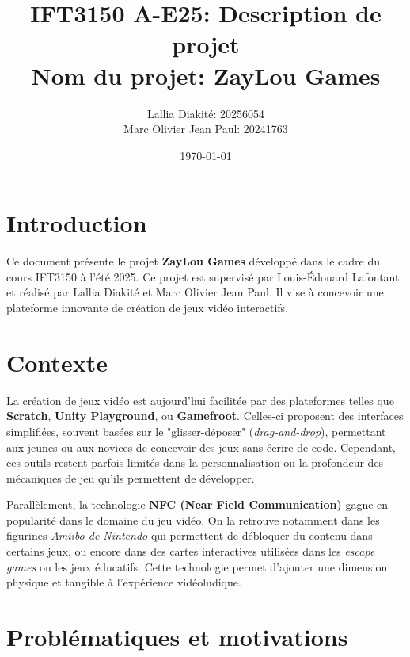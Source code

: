\documentclass{article}                             %
\title{IFT3150 A-E25: Description de projet \\      %
        Nom du projet: ZayLou Games}                %
\author{                                            %
    Lallia Diakité: 20256054 \\
    Marc Olivier Jean Paul: 20241763
}
\date{\today}                                       %
\begin{document}

\maketitle                                          %



\section{Introduction}                              %
\label{sec:intro}                                   %
Ce document présente le projet \textbf{ZayLou Games} développé dans le cadre du cours IFT3150 à l'été 2025. 
Ce projet est supervisé par Louis-Édouard Lafontant et réalisé par Lallia Diakité et Marc Olivier Jean Paul. 
Il vise à concevoir une plateforme innovante de création de jeux vidéo interactifs.

\section{Contexte}                                   %
\label{sec:contexte}                                %
La création de jeux vidéo est aujourd’hui facilitée par des plateformes telles
que \textbf{Scratch}, \textbf{Unity Playground}, ou \textbf{Gamefroot}. 
Celles-ci proposent des interfaces simplifiées, souvent basées sur le "glisser-déposer" 
(\textit{drag-and-drop}), permettant aux jeunes ou aux novices de concevoir des jeux 
sans écrire de code. Cependant, ces outils restent parfois limités dans la 
personnalisation ou la profondeur des mécaniques de jeu qu’ils permettent de développer.

Parallèlement, la technologie \textbf{NFC (Near Field Communication)} gagne en popularité dans le domaine du jeu vidéo. On la retrouve notamment dans les figurines \textit{Amiibo de Nintendo} qui permettent de débloquer du contenu dans certains jeux, ou encore dans des cartes interactives utilisées dans les \textit{escape games} ou les jeux éducatifs. Cette technologie permet d’ajouter une dimension physique et tangible à l’expérience vidéoludique.

\section{Problématiques et motivations}     %
\label{sec:problématiques}                        %
\end{document}

